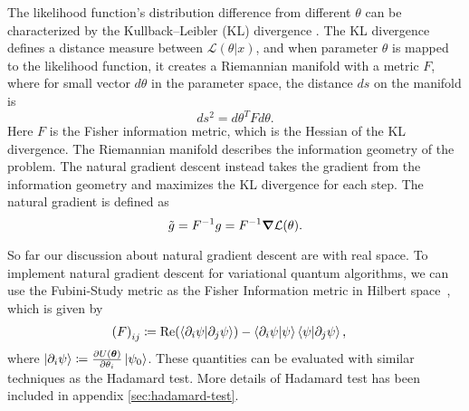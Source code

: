 The likelihood function's distribution difference from different $\theta$ can be characterized by the Kullback–Leibler (KL) divergence \cite{Kullback1951}. The KL divergence defines a distance measure between $\mathcal{L}(\theta|x)$, and when parameter $\theta$ is mapped to the likelihood function, it creates a Riemannian manifold with a metric $F$, where for small vector $d\theta$ in the parameter space, the distance $ds$ on the manifold is 
\begin{equation}
    ds^2 = d\theta^T F d\theta.
\end{equation}
Here $F$ is the Fisher information metric, which is the Hessian of the KL divergence. The Riemannian manifold describes the information geometry of the problem. The natural gradient descent instead takes the gradient from the information geometry and maximizes the KL divergence for each step. The natural gradient is defined as 
\begin{equation}
    \Tilde{g} = F^{-1}g  =F^{-1} \grad \mathcal{L}(\theta).
\end{equation}

So far our discussion about natural gradient descent are with real space. To implement natural gradient descent for variational quantum algorithms, we can use the Fubini-Study metric as the Fisher Information metric in Hilbert space~\cite{safranek_simple_2018,liu_quantum_2020}, which is given by \cite{wierichs_avoiding_2020,yamamoto_natural_2019,stokes_quantum_2020,Straaten2020}
\begin{equation}
  \begin{split}
    \left(F\right)_{ij} &\coloneqq \operatorname{Re}({\braket{\partial_{i}\psi|\partial_{j}\psi})-\braket{\partial_{i}\psi|\psi}}\braket{\psi|\partial_{j}\psi},
  \end{split}
\end{equation}
where $\ket{\partial_i \psi}\coloneqq \frac{\partial U(\boldsymbol{\theta})}{\partial \theta_i}\ket{\psi_0}$. These quantities can be evaluated with similar techniques as the Hadamard test. More details of Hadamard test has been included in appendix \ref{sec:hadamard-test}.

